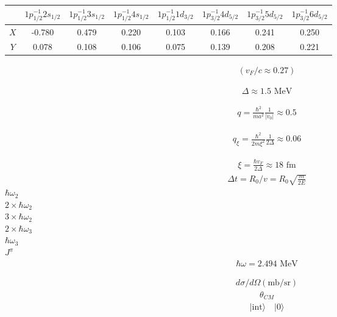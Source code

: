 \documentclass[a4paper,12pt]{book}
\numberwithin{equation}{section}
\numberwithin{figure}{section}
\numberwithin{table}{section}
\newcommand{\ket}[1]{|{#1} \rangle }
\begin{document}
\begin{table}
\begin{tabular}{c|c|c|c|c|c|c|c}
		&$1p^{-1}_{1/2}2s_{1/2}$ &$1p^{-1}_{1/2}3s_{1/2}$  &$1p^{-1}_{1/2}4s_{1/2}$  &$1p^{-1}_{1/2}1d_{3/2}$  &$1p^{-1}_{3/2}4d_{5/2}$  &$1p^{-1}_{3/2}5d_{5/2}$ &$1p^{-1}_{3/2}6d_{5/2}$   \\
		\hline 
	$X$	& -0.780 &0.479  &0.220  &0.103  &0.166  &0.241  & 0.250 \\
	\hline
	$Y$	& 0.078 &0.108  &0.106  &0.075 &0.139  &0.208  & 0.221  
\end{tabular} 
\end{table}

\begin{align}\label{eq50}
(v_F/c\approx 0.27)
\end{align}

\begin{align}\label{eq50}
\Delta\approx 1.5\text{ MeV}
\end{align}

\begin{align}\label{eq50}
q=\frac{\hbar^2}{ma^2}\frac{1}{|v_0|}\approx 0.5
\end{align}


\begin{align}\label{eq50}
q_\xi=\frac{\hbar^2}{2m\xi^2}\frac{1}{2\Delta}\approx 0.06
\end{align}

\begin{align}\label{eq50}
\xi=\frac{\hbar v_F}{2\Delta}\approx 18\text{ fm}
\end{align}
\begin{align}\label{eq50}
\Delta t=R_0/v=R_0\sqrt{\frac{m}{2E}}
\end{align}
$\hbar\omega_2$\\ $2\times\hbar\omega_2$\\$3\times\hbar\omega_2$\\$2\times\hbar\omega_3$\\$\hbar\omega_3$\\
$J^\pi$\\
\begin{align}\label{eq50}
\hbar\omega=2.494\text{ MeV}
\end{align}

\begin{align}\label{eq50}
d\sigma/d\Omega(\text{mb/sr})
\end{align}
\begin{align}\label{eq50}
\theta_{CM}
\end{align}
\begin{align}\label{eq50}
\ket{\text{int}}\quad\ket{0}
\end{align}
\end{document}
